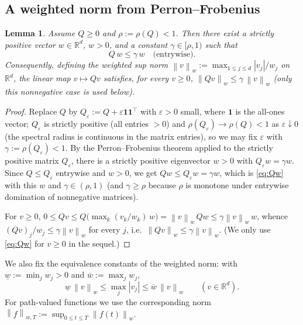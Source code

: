\documentclass{amsart}
\newtheorem{lemma}{Lemma}
\theoremstyle{definition}
\theoremstyle{remark}
\newcommand{\R}{\mathbb{R}}
\newcommand{\norm}[1]{\left\lVert#1\right\rVert}
\begin{document}
\subsection{A weighted norm from Perron--Frobenius}

\begin{lemma}\label{lem:weight}
Assume $Q\ge0$ and $\rho:=\rho(Q)<1$. Then there exist a strictly positive
vector $w\in\R^d$, $w>0$, and a constant $\gamma\in[\rho,1)$ such that
\begin{equation}\label{eq:Qw}
  Q\,w\le \gamma\,w \quad\text{(entrywise).}
\end{equation}
Consequently, defining the weighted sup norm
$\norm{v}_w:=\max_{1\le j\le d}|v_j|/w_j$ on $\R^d$, the linear map
$v\mapsto Qv$ satisfies, for every $v\ge0$,
$\norm{Qv}_w\le\gamma\,\norm{v}_w$ (only this nonnegative case is used
below).
\end{lemma}

\begin{proof}
Replace $Q$ by $Q_\varepsilon:=Q+\varepsilon\mathbf 1\mathbf 1^\top$ with
$\varepsilon>0$ small, where $\mathbf 1$ is the all-ones vector; $Q_\varepsilon$
is strictly positive (all entries $>0$) and $\rho(Q_\varepsilon)\to\rho(Q)<1$ as
$\varepsilon\downarrow0$ (the spectral radius is continuous in the matrix
entries), so we may fix $\varepsilon$ with $\gamma:=\rho(Q_\varepsilon)<1$. By
the Perron--Frobenius theorem applied to the strictly positive matrix
$Q_\varepsilon$, there is a strictly positive eigenvector $w>0$ with
$Q_\varepsilon w=\gamma w$. Since $Q\le Q_\varepsilon$ entrywise and $w>0$, we
get $Qw\le Q_\varepsilon w=\gamma w$, which is \eqref{eq:Qw} with this $w$ and
$\gamma\in(\rho,1)$ (and $\gamma\ge\rho$ because $\rho$ is monotone under
entrywise domination of nonnegative matrices).

For $v\ge0$, $0\le Qv\le Q\big(\max_k(v_k/w_k)\,w\big)
=\norm{v}_w\,Qw\le \gamma\norm{v}_w\,w$, whence
$(Qv)_j/w_j\le\gamma\norm{v}_w$ for every $j$, i.e.\
$\norm{Qv}_w\le\gamma\norm{v}_w$. (We only use \eqref{eq:Qw} for $v\ge0$ in the
sequel.)
\end{proof}

We also fix the equivalence constants of the weighted norm: with
$\underline w:=\min_j w_j>0$ and $\overline w:=\max_j w_j$,
\begin{equation}\label{eq:equiv}
  \underline w\,\norm{v}_w\le \max_j|v_j|\le \overline w\,\norm{v}_w
  \qquad(v\in\R^d).
\end{equation}
For path-valued functions we use the corresponding norm
$\norm{f}_{w,T}:=\sup_{0\le t\le T}\norm{f(t)}_w$.
\end{document}
